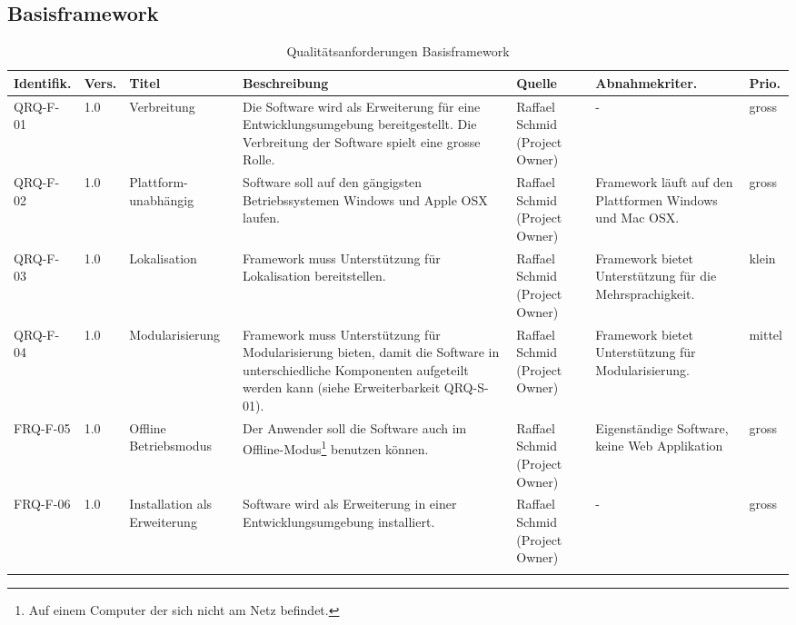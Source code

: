\begin{landscape}
\begin{longtable}{|p{1.6cm}|p{0.7cm}|p{2.5cm}|p{4.5cm}|p{2.6cm}|p{4cm}|p{0.9cm}|}
\end{longtable}
\subsection{Basisframework}\label{anforderungen_framework}
\begin{longtable}{|p{1.6cm}|p{0.7cm}|p{2.5cm}|p{4.5cm}|p{2.6cm}|p{4cm}|p{0.9cm}|}
    \hline\textbf{Identifik.} & \textbf{Vers.}& \textbf{Titel} & \textbf{Beschreibung} & \textbf{Quelle} & \textbf{Abnahmekriter.} & \textbf{Prio.}\\\hline
   QRQ-F-01 & 1.0 & Verbreitung & Die Software wird als Erweiterung für eine Entwicklungsumgebung bereitgestellt. Die Verbreitung der Software spielt eine grosse Rolle. & Raffael Schmid (Project Owner) & - & gross \\\hline

   QRQ-F-02 & 1.0 & Plattform-unabhängig & Software soll auf den gängigsten Betriebssystemen Windows und Apple OSX laufen. & Raffael Schmid (Project Owner) &  Framework läuft auf den Plattformen Windows und Mac OSX. & gross \\\hline

   QRQ-F-03 & 1.0 & Lokalisation & Framework muss Unterstützung für Lokalisation bereitstellen.& Raffael Schmid (Project Owner) & Framework bietet Unterstützung für die Mehrsprachigkeit. &klein \\\hline

   QRQ-F-04 & 1.0 & Modularisierung & Framework muss Unterstützung für Modularisierung bieten, damit die Software in unterschiedliche Komponenten aufgeteilt werden kann (siehe Erweiterbarkeit QRQ-S-01). & Raffael Schmid (Project Owner) & Framework bietet Unterstützung für Modularisierung.&mittel \\\hline

   FRQ-F-05 & 1.0 & Offline Betriebsmodus & Der Anwender soll die Software auch im Offline-Modus\footnote{Auf einem Computer der sich nicht am Netz befindet.} benutzen können. & Raffael Schmid (Project Owner) & Eigenständige Software, keine Web Applikation & gross  \\\hline

   FRQ-F-06 & 1.0 & Installation als Erweiterung& Software wird als Erweiterung in einer Entwicklungsumgebung installiert. & Raffael Schmid (Project Owner) & - & gross  \\\hline
    \caption{Qualitätsanforderungen Basisframework}
\end{longtable}
\end{landscape}
